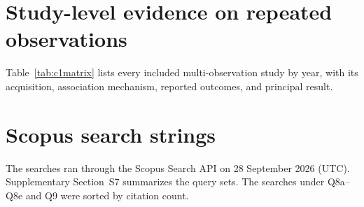 \documentclass[a4paper,fleqn]{cas-dc}
\begin{document}
\section{Study-level evidence on repeated observations}\label{app:c1}
Table~\ref{tab:c1matrix} lists every included multi-observation study by year, with its acquisition, association mechanism, reported outcomes, and principal result.

\section{Scopus search strings}\label{app:queries}
The searches ran through the Scopus Search API on 28 September 2026 (UTC). Supplementary Section~S7 summarizes the query sets. The searches under Q8a--Q8e and Q9 were sorted by citation count.

\end{document}
